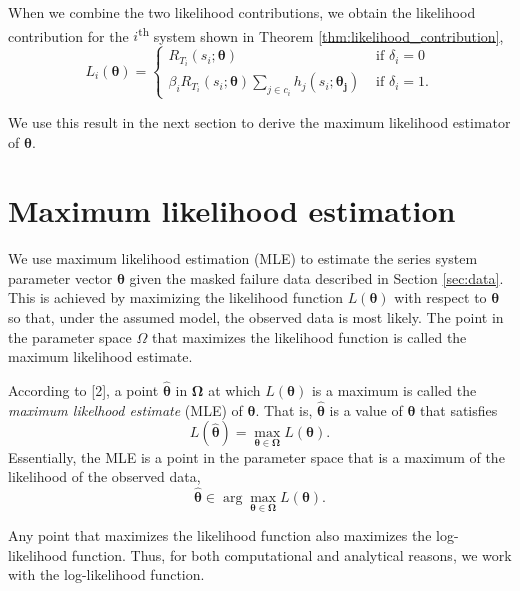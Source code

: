 \documentclass[
]{article}
\begin{document}
When we combine the two likelihood contributions, we obtain the
likelihood contribution for the \(i\)\textsuperscript{th} system shown
in Theorem \ref{thm:likelihood_contribution}, \[
L_i(\boldsymbol{\theta}) =
\begin{cases}
    R_{T_i}(s_i;\boldsymbol{\theta})                      &\text{ if } \delta_i = 0\\
    \beta_i R_{T_i}(s_i;\boldsymbol{\theta})
        \sum_{j\in c_i} h_j(s_i;\boldsymbol{\theta_j})   &\text{ if } \delta_i = 1.
\end{cases}
\]

We use this result in the next section to derive the maximum likelihood
estimator of \(\boldsymbol{\theta}\).

\hypertarget{sec:mle}{%
\section{Maximum likelihood estimation}\label{sec:mle}}

We use maximum likelihood estimation (MLE) to estimate the series system
parameter vector \(\boldsymbol{\theta}\) given the masked failure data
described in Section \ref{sec:data}. This is achieved by maximizing the
likelihood function \(L(\boldsymbol{\theta})\) with respect to
\(\boldsymbol{\theta}\) so that, under the assumed model, the observed
data is most likely. The point in the parameter space \(\Omega\) that
maximizes the likelihood function is called the maximum likelihood
estimate.

According to {[}2{]}, a point \(\hat{\boldsymbol{\theta}}\) in
\(\boldsymbol{\Omega}\) at which \(L(\boldsymbol{\theta})\) is a maximum
is called the \emph{maximum likelhood estimate} (MLE) of
\(\boldsymbol{\theta}\). That is, \(\hat{\boldsymbol{\theta}}\) is a
value of \(\boldsymbol{\theta}\) that satisfies \begin{equation}
\label{eq:mle}
L(\hat{\boldsymbol{\theta}}) = \max_{\boldsymbol{\theta }\in \boldsymbol{\Omega}} L(\boldsymbol{\theta}).
\end{equation} Essentially, the MLE is a point in the parameter space
that is a maximum of the likelihood of the observed data, \[
\hat{\boldsymbol{\theta}} \in \arg\max_{\boldsymbol{\theta }\in \boldsymbol{\Omega}} L(\boldsymbol{\theta}).
\]

Any point that maximizes the likelihood function also maximizes the
log-likelihood function. Thus, for both computational and analytical
reasons, we work with the log-likelihood function.
\end{document}
